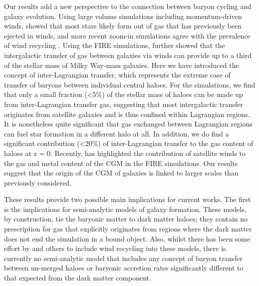 Our results add a new perspective to the connection between baryon cycling
and galaxy evolution. Using large volume simulations including
momentum-driven winds, \citet{Oppenheimer2010} showed that most stars likely
form out of gas that has previously been ejected in winds, and more recent
zoom-in simulations agree with the prevalence of wind recycling
\citep{Christensen2016, AnglesAlcazar2017, Tollet2019}. Using the FIRE
simulations, \citet{AnglesAlcazar2017} further showed that the intergalactic
transfer of gas between galaxies via winds can provide up to a third of the
stellar mass of Milky Way-mass galaxies. Here we have introduced the concept
of inter-Lagrangian transfer, which represents the extreme case of transfer
of baryons between individual central haloes. For the \simba{} simulations,
we find that only a small fraction (<5\%) of the stellar mass of haloes can
be made up from inter-Lagrangian transfer gas, suggesting that most
intergalactic transfer originates from satellite galaxies and is thus
confined within Lagrangian regions. It is nonetheless quite significant that
gas exchanged between Lagrangian regions can fuel star formation in a
different halo at all. In addition, we do find a significant contribution
(<20\%) of inter-Lagrangian transfer to the gas content of haloes at z = 0.
Recently, \citet{Hafen2019} has highlighted the contribution of satellite
winds to the gas and metal content of the CGM in the FIRE simulations. Our
results suggest that the origin of the CGM of galaxies is linked to larger
scales than previously considered.

These results provide two possible main implications for current works. The
first is the implications for semi-analytic models of galaxy formation. These
models, by construction, tie the baryonic matter to dark matter haloes; they
contain no prescription for gas that explicitly originates from regions where
the dark matter does not end the simulation in a bound object. Also, whilst
there has been some effort by \citet{Henriques2015, White2015} and others to
include wind recycling into these models, there is currently no semi-analytic
model that includes any concept of baryon transfer between un-merged haloes
or baryonic accretion rates significantly different to that expected from the
dark matter component.


